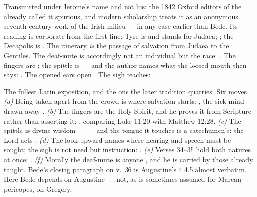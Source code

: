 \begin{witnessnote}
Transmitted under Jerome's name and not his: the 1842 Oxford editors of the
 already called it spurious, and modern scholarship treats it as
an anonymous seventh-century work of the Irish milieu --- in any case earlier
than Bede. Its reading is corporate from the first line: Tyre is
 and stands for Judaea; ; the Decapolis is
. The itinerary \textit{is} the passage of salvation
from Judaea to the Gentiles. The deaf-mute is accordingly not an individual but
the race: . The fingers are
; the spittle is  --- and the author names what the loosed
mouth then says: . The opened ears
open . The sigh teaches: .
\end{witnessnote}

\begin{witnessnote}
The fullest Latin exposition, and the one the later tradition quarries. Six
moves. \textit{(a)} Being taken apart from the crowd is where salvation starts:
, the sick mind drawn away . \textit{(b)} The fingers are the Holy Spirit, and he proves it from
Scripture rather than asserting it: , comparing Luke 11:20 with
Matthew 12:28. \textit{(c)} The spittle is divine wisdom ---  --- and the tongue it touches is a
catechumen's: the Lord acts . \textit{(d)} The look upward names where hearing and
speech must be sought; the sigh is not need but instruction: . \textit{(e)} Verses 34--35 hold both natures at
once: . \textit{(f)} Morally the
deaf-mute is anyone , and he is carried by those already taught. Bede's closing
paragraph on v.~36 is Augustine's
 4.4.5 almost verbatim. Here Bede depends on
Augustine --- not, as is sometimes assumed for Marcan pericopes, on Gregory.
\end{witnessnote}

